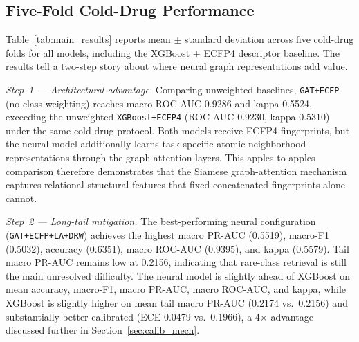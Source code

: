 \documentclass[11pt,a4paper,twocolumn]{article}
\begin{document}
\subsection{Five-Fold Cold-Drug Performance}
Table~\ref{tab:main_results} reports mean $\pm$ standard deviation across five
cold-drug folds for all models, including the XGBoost + ECFP4 descriptor baseline.
The results tell a two-step story about where neural graph representations add value.

\textit{Step~1 --- Architectural advantage.}
Comparing unweighted baselines, \texttt{GAT+ECFP} (no class weighting) reaches
macro ROC-AUC 0.9286 and kappa 0.5524, exceeding the unweighted \texttt{XGBoost+ECFP4}
(ROC-AUC 0.9230, kappa 0.5310) under the same cold-drug protocol.
Both models receive ECFP4 fingerprints, but the neural model additionally
learns task-specific atomic neighborhood representations through the
graph-attention layers.
This apples-to-apples comparison therefore demonstrates that the Siamese
graph-attention mechanism captures relational structural features that
fixed concatenated fingerprints alone cannot.

\textit{Step~2 --- Long-tail mitigation.}
The best-performing neural configuration (\texttt{GAT+ECFP+LA+DRW}) achieves the
highest macro PR-AUC (0.5519), macro-F1 (0.5032), accuracy (0.6351),
macro ROC-AUC (0.9395), and kappa (0.5579).
Tail macro PR-AUC remains low at 0.2156, indicating that rare-class retrieval
is still the main unresolved difficulty.
The neural model is slightly ahead of XGBoost on mean accuracy, macro-F1,
macro PR-AUC, macro ROC-AUC, and kappa, while XGBoost is slightly higher on
mean tail macro PR-AUC (0.2174 vs.\ 0.2156) and substantially better calibrated
(ECE 0.0479 vs.\ 0.1966), a 4$\times$ advantage discussed further in
Section~\ref{sec:calib_mech}.
\end{document}
